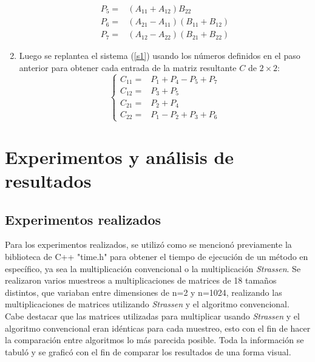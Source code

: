 \documentclass[12pt,letterpaper]{article}
\begin{document}
\begin{enumerate}
\begin{equation}
\begin{split}
        P_{5}= &  (A_{11}+A_{12})B_{22} \\
        P_{6}= &  (A_{21}-A_{11})(B_{11}+B_{12}) \\
        P_{7}= &  (A_{12}-A_{22})(B_{21}+B_{22})
	\end{split}
\label{7s}
\end{equation}
\item Luego se replantea el sistema (\ref{s1}) usando los números definidos en el paso anterior para obtener cada entrada de la matriz resultante $C$ de $2\times2$:
\begin{equation}
	\begin{cases}
		C_{11}= &  P_{1}+P_{4}-P_{5}+P_{7} \\
		C_{12}= &  P_{3}+P_{5} \\
		C_{21}= &  P_{2}+P_{4} \\
        C_{22}= &  P_{1}-P_{2}+P_{3}+P_{6}
	\end{cases}
\label{p2}
\end{equation}

\end{enumerate}

\section{Experimentos y análisis de resultados}
\subsection{Experimentos realizados}
Para los experimentos realizados, se utilizó como se mencionó previamente la biblioteca de C++ "time.h" para obtener el tiempo de ejecución de un método en específico, ya sea la multiplicación convencional o la multiplicación \textit{Strassen}. Se realizaron varios muestreos a multiplicaciones de matrices de 18 tamaños distintos, que variaban entre dimensiones de n=2 y n=1024, realizando las multiplicaciones de matrices utilizando \textit{Strassen} y el algoritmo convencional. Cabe destacar que las matrices utilizadas para multiplicar usando \textit{Strassen} y el algoritmo convencional eran idénticas para cada muestreo, esto con el fin de hacer la comparación entre algoritmos lo más parecida posible. Toda la información se tabuló y se graficó con el fin de comparar los resultados de una forma visual.  
\end{document}
